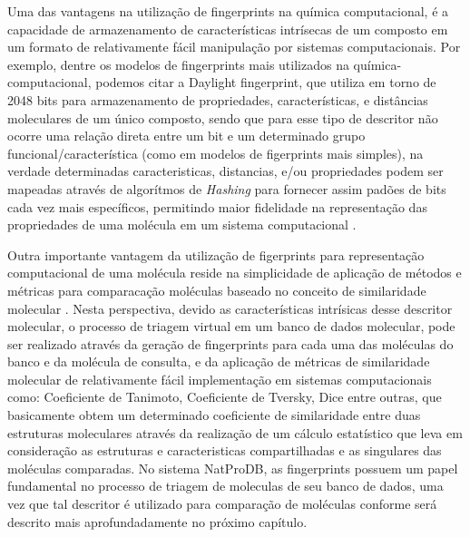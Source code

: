 Uma das vantagens na utilização de fingerprints na química computacional, é a capacidade de armazenamento de características intrísecas de um composto em um formato de relativamente fácil manipulação por sistemas computacionais. Por exemplo, dentre os modelos de fingerprints mais utilizados na química-computacional, podemos citar a Daylight fingerprint, que utiliza em torno de 2048 bits para armazenamento de propriedades, características, e distâncias moleculares de um único composto, sendo que para esse tipo de descritor não ocorre uma relação direta entre um bit e um determinado grupo funcional/característica (como em modelos de figerprints mais simples), na verdade determinadas caracteristicas, distancias, e/ou propriedades podem ser mapeadas através de algorítmos de \textit{Hashing} para fornecer assim padões de bits cada vez mais específicos, permitindo maior fidelidade na representação das propriedades de uma molécula em um sistema computacional \cite{xue2000molecular}.

Outra importante vantagem da utilização de figerprints para representação computacional de uma molécula reside na simplicidade de aplicação de métodos e métricas para comparacação moléculas baseado no conceito de similaridade molecular \cite{xue2000molecular}. Nesta perspectiva, devido as características intrísicas  desse descritor molecular, o processo de triagem virtual em um banco de dados molecular, pode ser realizado através da geração de fingerprints para cada uma das moléculas do banco e da molécula de consulta, e da aplicação de métricas de similaridade molecular de relativamente fácil implementação em sistemas computacionais como: Coeficiente de Tanimoto, Coeficiente de Tversky, Dice entre outras, que basicamente obtem um determinado coeficiente de similaridade entre duas estruturas moleculares através da realização de um cálculo estatístico que leva em consideração as estruturas e caracteristicas compartilhadas e as singulares das moléculas comparadas. No sistema NatProDB, as fingerprints possuem um papel fundamental no processo de triagem de moleculas de seu banco de dados, uma vez que tal descritor é utilizado para comparação de moléculas conforme será descrito mais aprofundadamente no próximo capítulo.  
     

